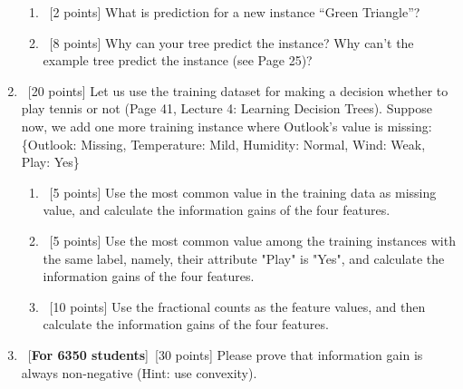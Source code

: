 \documentclass[12pt, fullpage,letterpaper]{article}
\begin{document}
\begin{enumerate}
\begin{enumerate}
\item~[2 points] What is prediction for a new instance ``Green Triangle''? 
\item~[8 points] Why can your tree predict the instance? Why can't the example tree predict the instance (see Page 25)?
\end{enumerate}
\item~[20 points] Let us use the training dataset for making a decision whether to play tennis or not (Page 41, Lecture 4: Learning Decision Trees). Suppose now, we add one more training instance where Outlook's value is missing: \{Outlook: Missing, Temperature: Mild, Humidity: Normal, Wind: Weak, Play: Yes\}  
\begin{enumerate}
\item~[5 points] Use the most common value in the training data as missing  value, and calculate the information gains of the four features. 
\item~[5 points] Use the most common value among the  training instances with the same label, namely, their attribute "Play" is "Yes", and calculate the information gains of the four features. 
\item~[10 points] Use the fractional counts as the feature values, and then calculate the information gains of the four features. 

\end{enumerate}
\item ~[\textbf{For 6350 students}]~[30 points] Please prove that information gain is always non-negative (Hint: use convexity).  

\end{enumerate}
\end{document}
